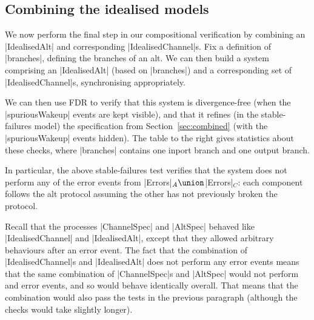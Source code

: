 \subsection{Combining the idealised models}

We now perform the final step in our compositional verification by combining
an |IdealisedAlt| and corresponding |IdealisedChannel|s.
%
Fix a definition of |branches|, defining the branches of an
alt.  We can then build a system comprising an |IdealisedAlt| (based on
|branches|) and a corresponding set of |IdealisedChannel|s, synchronising
appropriately.

\begin{window}
%
We can then use FDR to verify that this system is divergence-free (when the
|spuriousWakeup| events are kept visible), and that it refines (in the
stable-failures model) the specification from Section~\ref{sec:combined} (with
the |spuriousWakeup| events hidden).  The table to the right gives statistics about these checks, where
|branches| contains one inport branch and one output branch.
\end{window}

In particular, the above stable-failures test verifies that the system does
not perform any of the error events from |Errors|$_A \union\null$|Errors|$_C$:
each component follows the alt protocol assuming the other has not previously
broken the protocol.

Recall that the processes |ChannelSpec| and |AltSpec| behaved like
|IdealisedChannel| and |IdealisedAlt|, except that they allowed arbitrary
behaviours after an error event.  The fact that the combination of
|IdealisedChannel|s and |IdealisedAlt| does not perform any error events means
that the same combination of |ChannelSpec|s and |AltSpec| would not perform
and error events, and so would behave identically overall.  That means that
the combination would also pass the tests in the previous paragraph (although
the checks would take slightly longer).

